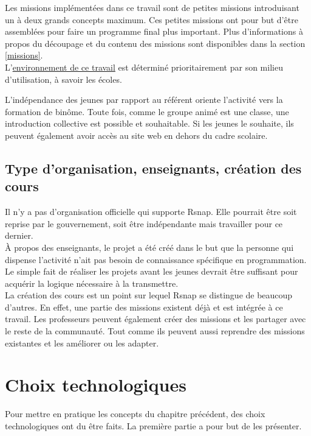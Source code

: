 Les missions implémentées dans ce travail sont de petites missions introduisant un à deux grands concepts maximum. Ces petites missions ont pour but d'être assemblées pour faire un programme final plus important. Plus d'informations à propos du découpage et du contenu des missions sont disponibles dans la section \ref{missions}.\\

L'\underline{environnement de ce travail} est déterminé prioritairement par son milieu d'utilisation, à savoir les écoles. 

L'indépendance des jeunes par rapport au référent oriente l'activité vers la formation de binôme. Toute fois, comme le groupe animé est une classe, une introduction collective est possible et souhaitable. 
Si les jeunes le souhaite, ils peuvent également avoir accès au site web en dehors du cadre scolaire.

\subsection{Type d'organisation, enseignants, création des cours}
Il n'y a pas d'organisation officielle qui supporte Rsnap. Elle pourrait être soit reprise par le gouvernement, soit être indépendante mais travailler pour ce dernier.\\

À propos des enseignants, le projet a été créé dans le but que la personne qui dispense l'activité n'ait pas besoin de connaissance spécifique en programmation. Le simple fait de réaliser les projets avant les jeunes devrait être suffisant pour acquérir la logique nécessaire à la transmettre.\\

La création des cours est un point sur lequel Rsnap se distingue de beaucoup d'autres. En effet, une partie des missions existent déjà et est intégrée à ce travail. Les professeurs peuvent également créer des missions et les partager avec le reste de la communauté. Tout comme ils peuvent aussi reprendre des missions existantes et les améliorer ou les adapter. %

\section{Choix technologiques} %
Pour mettre en pratique les concepts du chapitre précédent, des choix technologiques ont du être faits. La première partie a pour but de les présenter. 

